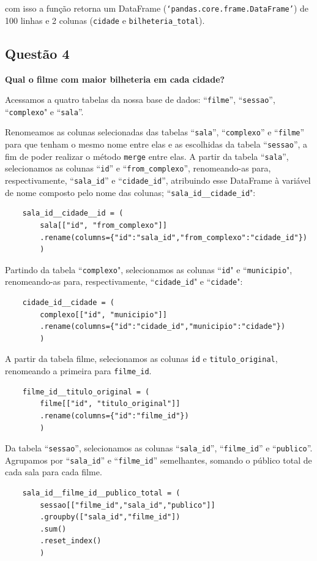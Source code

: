 \documentclass[12pt, a4paper]{article}
\begin{document}
com isso a função retorna um DataFrame (\texttt{`pandas.core.frame.DataFrame'}) de 100 linhas e 2 colunas (\texttt{cidade} e \texttt{bilheteria\_total}).

\subsection{Questão 4}
\textbf{Qual o filme com maior bilheteria em cada cidade? }

Acessamos a quatro tabelas da nossa base de dados: ``\texttt{filme}'', ``\texttt{sessao}'', ``\texttt{complexo}" e ``\texttt{sala}''. 

Renomeamos as colunas selecionadas das tabelas ``\texttt{sala}'', ``\texttt{complexo}'' e ``\texttt{filme}'' para que tenham o mesmo nome entre elas e as escolhidas da tabela ``\texttt{sessao}'', a fim de poder realizar o método \texttt{merge} entre elas. A partir da tabela ``\texttt{sala}'', selecionamos as colunas ``\texttt{id}'' e ``\texttt{from\_complexo}'', renomeando-as para, respectivamente, ``\texttt{sala\_id}'' e ``\texttt{cidade\_id}'', atribuindo esse DataFrame à variável de nome composto pelo nome das colunas; ``\texttt{sala\_id\_\_cidade\_id}":
\begin{verbatim}
    sala_id__cidade__id = (
        sala[["id", "from_complexo"]]
        .rename(columns={"id":"sala_id","from_complexo":"cidade_id"})
        )
\end{verbatim}
Partindo da tabela ``\texttt{complexo}", selecionamos as colunas ``\texttt{id}" e ``\texttt{municipio}", renomeando-as para, respectivamente, ``\texttt{cidade\_id}" e ``\texttt{cidade}":
\begin{verbatim}
    cidade_id__cidade = (
        complexo[["id", "municipio"]]
        .rename(columns={"id":"cidade_id","municipio":"cidade"})
        )
\end{verbatim}

A partir da tabela filme, selecionamos as colunas \texttt{id} e \texttt{titulo\_original}, renomeando a primeira para \texttt{filme\_id}.

\begin{verbatim}
    filme_id__titulo_original = (
        filme[["id", "titulo_original"]]
        .rename(columns={"id":"filme_id"})
        )
\end{verbatim}

Da tabela ``\texttt{sessao}'', selecionamos as colunas ``\texttt{sala\_id}'', ``\texttt{filme\_id}'' e ``\texttt{publico}''. Agrupamos por ``\texttt{sala\_id}'' e ``\texttt{filme\_id}'' semelhantes, somando o público total de cada sala para cada filme.
\begin{verbatim}
    sala_id__filme_id__publico_total = (
        sessao[["filme_id","sala_id","publico"]]
        .groupby(["sala_id","filme_id"])
        .sum()
        .reset_index()
        )
\end{verbatim}
\end{document}
